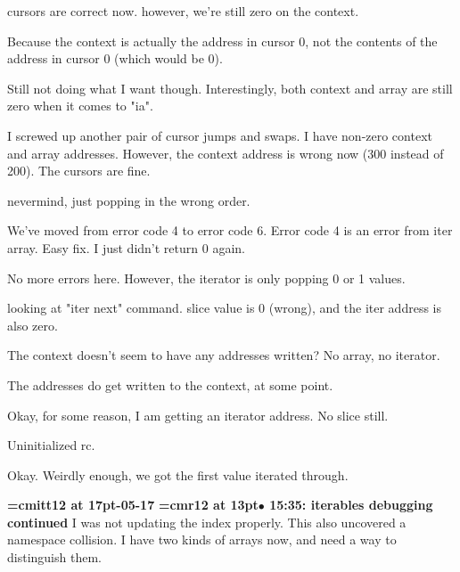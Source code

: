 cursors are correct now. however, we're still zero on the context.
\par

Because the context is actually the address in cursor 0, not the contents of the address in cursor 0 (which would be 0).
\par

Still not doing what I want though. Interestingly, both context and array are still zero when it comes to "ia".
\par

I screwed up another pair of cursor jumps and swaps. I have non-zero context and array addresses. However, the context address is wrong now (300 instead of 200). The cursors are fine.
\par

nevermind, just popping in the wrong order.
\par

We've moved from error code 4 to error code 6. Error code 4 is an error from iter array. Easy fix. I just didn't return 0 again.
\par

No more errors here. However, the iterator is only popping 0 or 1 values.
\par

looking at "iter next" command. slice value is 0 (wrong), and the iter address is also zero.
\par

The context doesn't seem to have any addresses written? No array, no iterator.
\par

The addresses do get written to the context, at some point.
\par

Okay, for some reason, I am getting an iterator address. No slice still.
\par

Uninitialized rc.
\par

Okay. Weirdly enough, we got the first value iterated through.
\par

{\medskip\noindent\bf\font\titlefont=cmitt12 at 17pt-05-17}\medskip
{\smallskip\noindent\bf\font\titlefont=cmr12 at 13pt\titlefont $\bullet$ 15:35: iterables debugging continued}\smallskip
I was not updating the index properly. This also uncovered a namespace collision. I have two kinds of arrays now, and need a way to distinguish them.
\par

